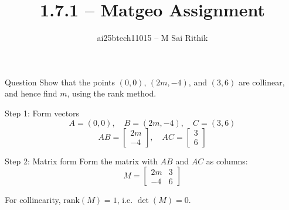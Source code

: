 \documentclass{beamer}
\title{1.7.1 -- Matgeo Assignment}
\author{ai25btech11015 -- M Sai Rithik}
\date{}
\begin{document}
\frame{\titlepage}
\begin{frame}{Question}
Show that the points \((0,0)\), \((2m,-4)\), and \((3,6)\) are collinear, and hence find \(m\), using the rank method.
\end{frame}

\begin{frame}{Step 1: Form vectors}
\[
A = (0,0), \quad B = (2m,-4), \quad C = (3,6)
\]
\[
AB = \begin{bmatrix}2m \\ -4\end{bmatrix}, 
\quad AC = \begin{bmatrix}3 \\ 6\end{bmatrix}
\]
\end{frame}

\begin{frame}{Step 2: Matrix form}
Form the matrix with \(AB\) and \(AC\) as columns:
\[
M = \begin{bmatrix}
2m & 3 \\
-4 & 6
\end{bmatrix}
\]

For collinearity, \(\text{rank}(M) = 1\), i.e. \(\det(M) = 0\).
\end{frame}
\end{document}
